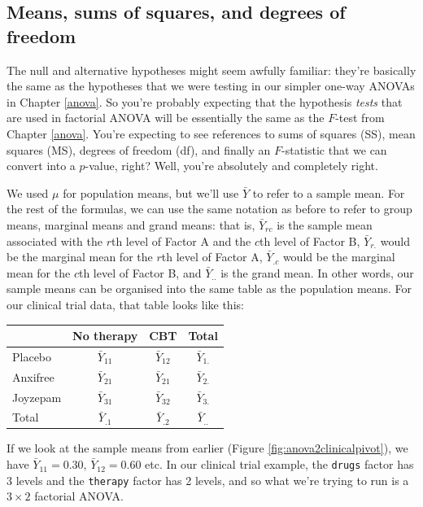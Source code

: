 \documentclass[
  11pt,
  a4paper,
  twoside,symmetric,openright]{book}
\theoremstyle{break}
\theoremstyle{break}
\begin{document}
\subsection{Means, sums of squares, and degrees of freedom}\label{means-sums-of-squares-and-degrees-of-freedom}

The null and alternative hypotheses might seem awfully familiar: they're basically the same as the hypotheses that we were testing in our simpler one-way ANOVAs in Chapter \ref{anova}. So you're probably expecting that the hypothesis \emph{tests} that are used in factorial ANOVA will be essentially the same as the \(F\)-test from Chapter \ref{anova}. You're expecting to see references to sums of squares (SS), mean squares (MS), degrees of freedom (df), and finally an \(F\)-statistic that we can convert into a \(p\)-value, right? Well, you're absolutely and completely right.

We used \(\mu\) for population means, but we'll use \(\bar{Y}\) to refer to a sample mean. For the rest of the formulas, we can use the same notation as before to refer to group means, marginal means and grand means: that is, \(\bar{Y}_{rc}\) is the sample mean associated with the \(r\)th level of Factor A and the \(c\)th level of Factor B, \(\bar{Y}_{r.}\) would be the marginal mean for the \(r\)th level of Factor A, \(\bar{Y}_{.c}\) would be the marginal mean for the \(c\)th level of Factor B, and \(\bar{Y}_{..}\) is the grand mean. In other words, our sample means can be organised into the same table as the population means. For our clinical trial data, that table looks like this:

\begin{longtable}[]{@{}lccc@{}}
\toprule\noalign{}
& No therapy & CBT & Total \\
\midrule\noalign{}
\endhead
\bottomrule\noalign{}
\endlastfoot
Placebo & \(\bar{Y}_{11}\) & \(\bar{Y}_{12}\) & \(\bar{Y}_{1.}\) \\
Anxifree & \(\bar{Y}_{21}\) & \(\bar{Y}_{21}\) & \(\bar{Y}_{2.}\) \\
Joyzepam & \(\bar{Y}_{31}\) & \(\bar{Y}_{32}\) & \(\bar{Y}_{3.}\) \\
Total & \(\bar{Y}_{.1}\) & \(\bar{Y}_{.2}\) & \(\bar{Y}_{..}\) \\
\end{longtable}

If we look at the sample means from earlier (Figure \ref{fig:anova2clinicalpivot}), we have \(\bar{Y}_{11} = 0.30\), \(\bar{Y}_{12} = 0.60\) etc. In our clinical trial example, the \texttt{drugs} factor has 3 levels and the \texttt{therapy} factor has 2 levels, and so what we're trying to run is a \(3 \times 2\) factorial ANOVA.
\end{document}

